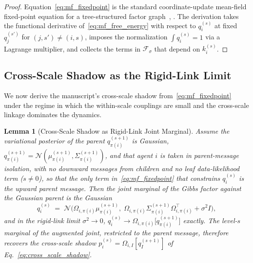 \documentclass[11pt]{article}
\newtheorem{lemma}{Lemma}
\begin{document}
\begin{proof}
Equation~\eqref{eq:mf_fixedpoint} is the standard coordinate-update mean-field fixed-point equation for a tree-structured factor graph~\cite[Prop.~4.1]{Wainwright2008}, \cite[\S10.1]{Bishop2006}. The derivation takes the functional derivative of~\eqref{eq:mf_free_energy} with respect to $q_i^{(s)}$ at fixed $q_{j}^{(s')}$ for $(j, s') \neq (i, s)$, imposes the normalization $\int q_i^{(s)} = 1$ via a Lagrange multiplier, and collects the terms in $\mathcal{F}_{\sigma}$ that depend on $k_i^{(s)}$.
\end{proof}

\subsection{Cross-Scale Shadow as the Rigid-Link Limit}

We now derive the manuscript's cross-scale shadow from~\eqref{eq:mf_fixedpoint} under the regime in which the within-scale couplings are small and the cross-scale linkage dominates the dynamics.

\begin{lemma}[Cross-Scale Shadow as Rigid-Link Joint Marginal]
\label{lem:shadow_mf_optimum}
Assume the variational posterior of the parent $q_{\pi(i)}^{(s+1)}$ is Gaussian, $q_{\pi(i)}^{(s+1)} = \mathcal{N}(\mu_{\pi(i)}^{(s+1)}, \Sigma_{\pi(i)}^{(s+1)})$, and that agent $i$ is taken in parent-message isolation, with no downward messages from children and no leaf data-likelihood term ($s \neq 0$), so that the only term in~\eqref{eq:mf_fixedpoint} that constrains $q_i^{(s)}$ is the upward parent message. Then the joint marginal of the Gibbs factor against the Gaussian parent is the Gaussian
\begin{equation}
q_i^{(s)} \;=\; \mathcal{N}\!\big(\Omega_{i,\pi(i)} \mu_{\pi(i)}^{(s+1)},\;\Omega_{i,\pi(i)} \Sigma_{\pi(i)}^{(s+1)} \Omega_{i,\pi(i)}^\top + \sigma^2 I\big),
\label{eq:shadow_soft}
\end{equation}
and in the rigid-link limit $\sigma^2 \to 0$, $q_i^{(s)} \to \Omega_{i,\pi(i)}\big[q_{\pi(i)}^{(s+1)}\big]$ exactly. The level-$s$ marginal of the augmented joint, restricted to the parent message, therefore recovers the cross-scale shadow $p_i^{(s)} = \Omega_{i,I}[q_I^{(s+1)}]$ of Eq.~\eqref{eq:cross_scale_shadow}.
\end{lemma}
\end{document}
